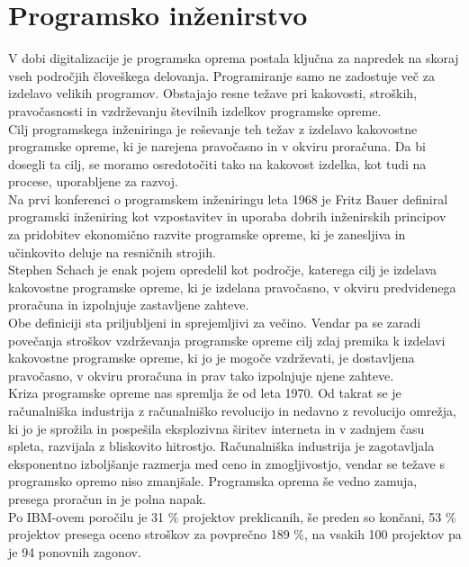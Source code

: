 \documentclass[a4paper,12pt,openright]{book}
\begin{document}
\section{Programsko inženirstvo} \label{chap:prog-inz}
V dobi digitalizacije je programska oprema postala ključna za napredek na skoraj vseh področjih človeškega delovanja. Programiranje samo ne zadostuje več za izdelavo velikih programov. Obstajajo resne težave pri kakovosti, stroških, pravočasnosti in vzdrževanju številnih izdelkov programske opreme.\\
Cilj programskega inženiringa je reševanje teh težav z izdelavo kakovostne programske opreme, ki je narejena pravočasno in v okviru proračuna. Da bi dosegli ta cilj, se moramo osredotočiti tako na kakovost izdelka, kot tudi na procese, uporabljene za razvoj.\cite{aggarwal2005software} \\
Na prvi konferenci o programskem inženiringu leta 1968 je Fritz Bauer \cite{randell19961968} definiral programski inženiring kot vzpostavitev in uporaba dobrih inženirskih principov za pridobitev ekonomično razvite programske opreme, ki je zanesljiva in učinkovito deluje na resničnih strojih. \\
Stephen Schach je enak pojem opredelil kot področje, katerega cilj je izdelava kakovostne programske opreme, ki je izdelana pravočasno, v okviru predvidenega proračuna in izpolnjuje zastavljene zahteve.\cite{randell19961968} \\ Obe definiciji sta priljubljeni in sprejemljivi za večino. Vendar pa se zaradi povečanja stroškov vzdrževanja programske opreme cilj zdaj premika k izdelavi kakovostne programske opreme, ki jo je mogoče vzdrževati, je dostavljena pravočasno, v okviru proračuna in prav tako izpolnjuje njene zahteve. \\
\sloppy
Kriza programske opreme nas spremlja že od leta 1970. Od takrat se je računalniška industrija z računalniško revolucijo in nedavno z revolucijo omrežja, ki jo je sprožila in  pospešila eksplozivna širitev interneta in v zadnjem času spleta, razvijala z bliskovito hitrostjo.
Računalniška industrija je zagotavljala eksponentno izboljšanje razmerja med ceno in zmogljivostjo, vendar se težave s programsko opremo niso zmanjšale. Programska oprema še vedno zamuja, presega proračun in je polna napak. \cite{aggarwal2005software} \\
Po IBM-ovem poročilu je 31 \% projektov preklicanih, še preden so končani, 53 \% projektov presega oceno stroškov za povprečno 189 \%, na vsakih 100 projektov pa je 94 ponovnih zagonov. \cite{boehm2006view}
\end{document}
